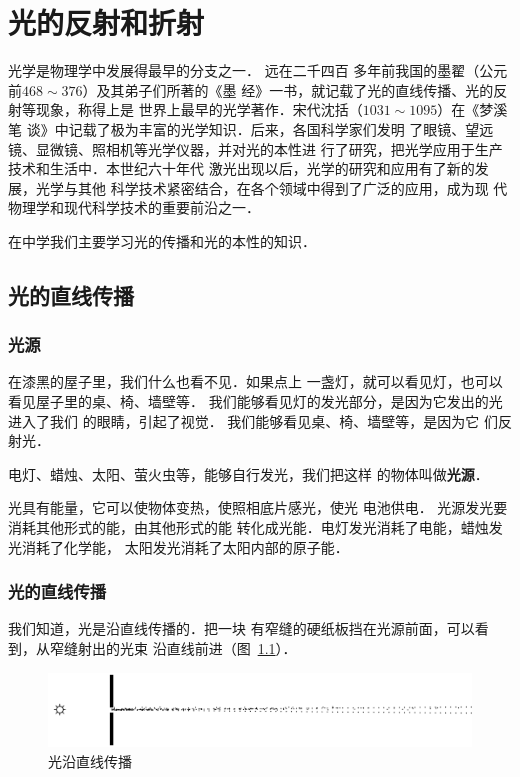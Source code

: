 \chapter{光的反射和折射}\label{chapter-reflection-and-refraction-of-light}

光学是物理学中发展得最早的分支之一．
远在二千四百
多年前我国的墨翟（公元前$468 \sim 376$）及其弟子们所著的《墨
经》一书，就记载了光的直线传播、光的反射等现象，称得上是
世界上最早的光学著作．宋代沈括（$1031 \sim 1095$）在《梦溪笔
谈》中记载了极为丰富的光学知识．后来，各国科学家们发明
了眼镜、望远镜、显微镜、照相机等光学仪器，并对光的本性进
行了研究，把光学应用于生产技术和生活中．本世纪六十年代
激光出现以后，光学的研究和应用有了新的发展，光学与其他
科学技术紧密结合，在各个领域中得到了广泛的应用，成为现
代物理学和现代科学技术的重要前沿之一．

在中学我们主要学习光的传播和光的本性的知识．

\section{光的直线传播}
\subsection{光源}

在漆黑的屋子里，我们什么也看不见．如果点上
一盏灯，就可以看见灯，也可以看见屋子里的桌、椅、墙壁等．
我们能够看见灯的发光部分，是因为它发出的光进入了我们
的眼睛，引起了视觉．
我们能够看见桌、椅、墙壁等，是因为它
们反射光．

电灯、蜡烛、太阳、萤火虫等，能够自行发光，我们把这样
的物体叫做\textbf{光源}．

光具有能量，它可以使物体变热，使照相底片感光，使光
电池供电．
光源发光要消耗其他形式的能，由其他形式的能
转化成光能．电灯发光消耗了电能，蜡烛发光消耗了化学能，
太阳发光消耗了太阳内部的原子能．

\subsection{光的直线传播}

我们知道，光是沿直线传播的．把一块
有窄缝的硬纸板挡在光源前面，可以看到，从窄缝射出的光束
沿直线前进（图~\ref{fig_C_5-1}）．
\begin{figure}[htbp]
    \centering
    \includegraphics{fig/C/5-1.pdf}
    \caption{光沿直线传播}\label{fig_C_5-1}
\end{figure}

